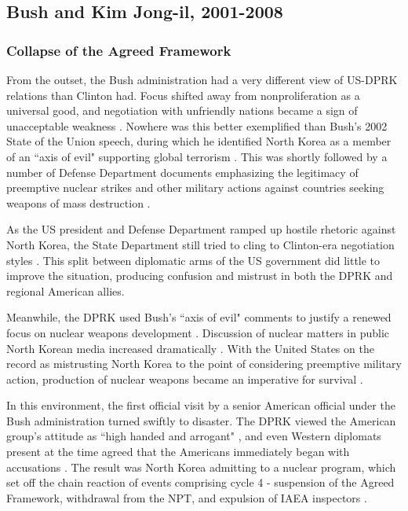 \documentclass{article}
\begin{document}
\subsection{Bush and Kim Jong-il, 2001-2008}

\subsubsection{Collapse of the Agreed Framework}

From the outset, the Bush administration had a very different view of US-DPRK relations than Clinton had. Focus shifted away from nonproliferation as a universal good, and negotiation with unfriendly nations became a sign of unacceptable weakness \cite{bleiker}. Nowhere was this better exemplified than Bush's 2002 State of the Union speech, during which he identified North Korea as a member of an ``axis of evil" supporting global terrorism \cite{sotu02}. This was shortly followed by a number of Defense Department documents emphasizing the legitimacy of preemptive nuclear strikes and other military actions against countries seeking weapons of mass destruction \cite{bleiker,npreview}.

As the US president and Defense Department ramped up hostile rhetoric against North Korea, the State Department still tried to cling to Clinton-era negotiation styles \cite{harnisch,armitage}. This split between diplomatic arms of the US government did little to improve the situation, producing confusion and mistrust in both the DPRK and regional American allies.

Meanwhile, the DPRK used Bush's ``axis of evil" comments to justify a renewed focus on nuclear weapons development \cite{bleiker}. Discussion of nuclear matters in public North Korean media increased dramatically \cite{rich14}. With the United States on the record as mistrusting North Korea to the point of considering preemptive military action, production of nuclear weapons became an imperative for survival \cite{hecker2}.

In this environment, the first official visit by a senior American official under the Bush administration turned swiftly to disaster. The DPRK viewed the American group's attitude as ``high handed and arrogant" \cite{kcna3}, and even Western diplomats present at the time agreed that the Americans immediately began with accusations \cite{bleiker}. The result was North Korea admitting to a nuclear program, which set off the chain reaction of events comprising cycle 4 - suspension of the Agreed Framework, withdrawal from the NPT, and expulsion of IAEA inspectors \cite{iaea09}. 
\end{document}
